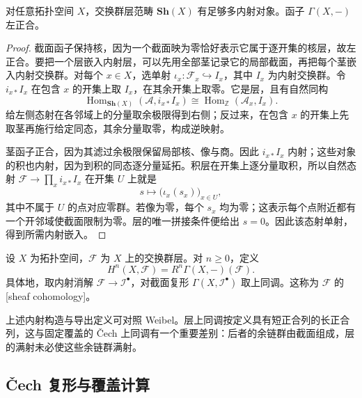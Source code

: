 \begin{proposition}\label{b4:prop:C-sheaf-injectives}
	对任意拓扑空间 \(X\)，交换群层范畴 \(\mathbf{Sh}(X)\) 有足够多内射对象。函子 \(\Gamma(X,-)\) 左正合。
\end{proposition}
\begin{proof}
	截面函子保持核，因为一个截面映为零恰好表示它属于逐开集的核层，故左正合。要把一个层嵌入内射层，可以先用全部茎记录它的局部截面，再把每个茎嵌入内射交换群。对每个 \(x\in X\)，选单射 \(\iota_x:\mathcal F_x\hookrightarrow I_x\)，其中 \(I_x\) 为内射交换群。令 \(i_{x*}I_x\) 在包含 \(x\) 的开集上取 \(I_x\)，在其余开集上取零。它是层，且有自然同构
	\[
		\operatorname{Hom}_{\mathbf{Sh}(X)}(\mathcal A,i_{x*}I_x) \cong\operatorname{Hom}_{\mathbb Z}(\mathcal A_x,I_x).
	\]
	给左侧态射在各邻域上的分量取余极限得到右侧；反过来，在包含 \(x\) 的开集上先取茎再施行给定同态，其余分量取零，构成逆映射。

	茎函子正合，因为其滤过余极限保留局部核、像与商。因此 \(i_{x*}I_x\) 内射；这些对象的积也内射，因为到积的同态逐分量延拓。积层在开集上逐分量取积，所以自然态射 \(\mathcal F\rightarrow\prod_x i_{x*}I_x\) 在开集 \(U\) 上就是
	\[
		s\longmapsto\bigl(\iota_x(s_x)\bigr)_{x\in U},
	\]
	其中不属于 \(U\) 的点对应零群。若像为零，每个 \(s_x\) 均为零；这表示每个点附近都有一个开邻域使截面限制为零。层的唯一拼接条件便给出 \(s=0\)。因此该态射单射，得到所需内射嵌入。
\end{proof}

\begin{definition}\label{b4:def:C-sheaf-cohomology}
	设 \(X\) 为拓扑空间，\(\mathcal F\) 为 \(X\) 上的交换群层。对 \(n\ge0\)，定义
	\[
		H^n(X,\mathcal F)=R^n\Gamma(X,-)(\mathcal F).
	\]
	具体地，取内射消解 \(\mathcal F\rightarrow\mathcal I^\bullet\)，对截面复形 \(\Gamma(X,\mathcal I^\bullet)\) 取上同调。这称为 \(\mathcal F\) 的[sheaf cohomology]。
\end{definition}

上述内射构造与导出定义可对照 Weibel\cite[Example 2.3.12, p. 42; Application 2.5.4, p. 51]{Weibel1994HomologicalAlgebra}。层上同调按定义具有短正合列的长正合列，这与固定覆盖的 Čech 上同调有一个重要差别：后者的余链群由截面组成，层的满射未必使这些余链群满射。

\subsection{Čech 复形与覆盖计算}
\label{b4:subsec:C03:02}

